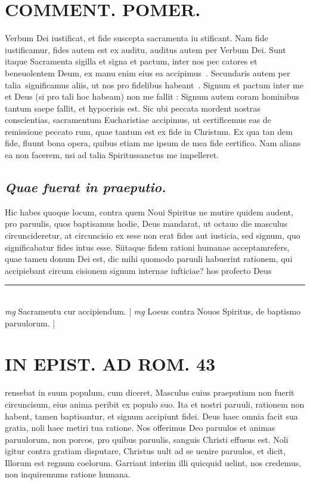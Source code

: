 \documentclass{article}
\begin{document}
\begin{pages}
\section*{COMMENT. POMER.  }\pstart Verbum Dei iustificat, et fide suscepta sacramenta iu stificant. Nam fide iustificamur, fides autem est ex auditu, auditus autem per Verbum Dei. Sunt itaque  Sacramenta sigilla et signa et pactum, inter nos pec catores et beneuolentem Deum, ex manu enim eius ea accipimus . Secundaris autem per talia significamus aliis, ut nos pro fidelibus habeant . Signum et pactum inter me et Deus (si pro tali hoc habeam) non me fallit : Signum autem coram hominibus tantum saepe fallit, et hypocrisis est. Sic ubi peccata mordent nostras conscientias, sacramentum Eucharistiae accipimus, ut certificemus eas de remissione peccato rum, quae tantum est ex fide in Christum. Ex qua tan dem fide, fluunt bona opera, quibus etiam me ipsum de mea fide certifico. Nam alians ea non facerem, nsi ad talia Spiritussanctus me impelleret.  \pend
{}
{}
\subsection*{\textit{Quae fuerat in praeputio. }}\pstart Hic habes quoque locum, contra quem Noui Spiritus ne mutire quidem audent, pro paruulis, quos baptisamus hodie, Deus mandarat, ut octauo die masculus circuncideretur, at circuncisio ex sese non erat fides aut iusticia, sed signum, quo significabatur fides intus esse. Siitaque fidem rationi humanae acceptamrefers, quae tamen donum Dei est, dic mihi quomodo paruuli habuerint rationem, qui accipiebant circum cisionem signum internae iufticiae? hos profecto Deus  \pend
\vspace{0.5cm}\noindent
\vspace{0.2cm}\rule{1cm}{0.2pt}\\ 
\hspace{0.2cm}\textit{mg}
\footnotesize Sacramentu cur accipiendum.  
\normalsize| 
\hspace{0.2cm}\textit{mg}
\footnotesize Loeus contra Nouos Spiritus, de baptismo paruulorum. 
\normalsize| 
\section*{IN EPIST. AD ROM.  43 }
\marginpar{[ p.]}\pstart rensebat in suum populum, cum diceret, Masculus cuius praeputium non fuerit circuncisum, eius anima peribit ex populo suo. Ita et nostri paruuli, rationem non habent, tamen baptisantur, et signum accipiunt fidei. Deus haec omnia facit sua gratia, noli haec metiri tua ratione. Nos offerimus Deo paruulos et animas paruulorum, non porcos, pro quibus paruulis, sanguis Christi effusus est. Noli igitur contra gratiam disputare, Christus uult ad se uenire paruulos, et dicit, Illorum est regnum coelorum. Garriant interim illi quicquid uelint, nos credemus, non inquiremums ratione humana.   \pend
{}
{}

\end{pages}
\end{document}
